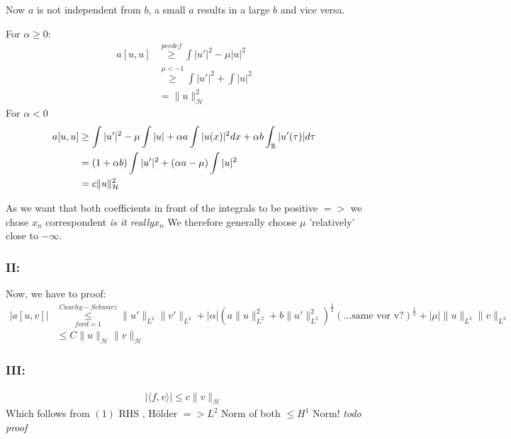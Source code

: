Now $a$ is not independent from $b$, a small $a$ results in a large $b$ and vice versa.

For $\alpha \geq 0$:
	\begin{align*}
		a[u, u] & \overset{per def}{\geq}  \int |u'|^{2} - \mu  |u|^{2} \\
				& \overset{\mu < -1}{\geq} \int |u'|^{2} + \int |u|^{2} \\
				& = \| u \|^{2}_{\mathcal{H}}
	\end{align*}
For $\alpha < 0$
	\begin{align*}
		a[u, u] & \geq \int |u'|^{2} - \mu \int |u| + \alpha a \int |u(x)|^{2} dx + \alpha b \int_{\mathbb{R}} | u'(\tau)| d\tau \\
				& = (1 + \alpha b) \int |u'|^{2} + (\alpha a - \mu) \int |u|^{2} \\
				& = c \| u \|^{2}_{\mathcal{H}}
	\end{align*}

As we want that both coefficients in front of the integrals to be positive $=>$ we chose $x_{n}$ correspondent \textit{ is it really}$x_n$ %
We therefore generally choose $\mu$ 'relatively' close to $-\infty$.

\subsubsection{II:} Now, we have to proof: \\ 

\begin{align*}
	|a[u, v]| & \overset{Cauchy-Schwarz}{\underset{for d=1}{\leq}} \| u' \|_{L^{2}} \| v' \|_{L^{2}} + |\alpha| \left( a \| u \|^{2}_{L^{2}} + b \| u' \|_{L^{2}}^{2} \right)^{\frac{1}{2}} \left(...\text{same vor v?} \right)^{\frac{1}{2}} + |\mu| \| u \|_{L^{2}} \|v \|_{L^{2}} \\
		& \leq C \| u \|_{\mathcal{H}} \| v \|_{\mathcal{H}}	
\end{align*}

\subsubsection{III:}
\begin{align*}
	|\langle f, v \rangle | \leq c \| v \|_{\mathcal{H}}
\end{align*}
Which follows from $(1)$ RHS , Hölder $=> L^{2}$ Norm of both $\leq H^{1}$ Norm! \textit{todo proof} %
\newline

